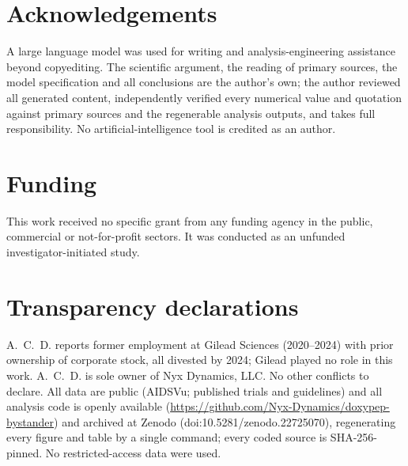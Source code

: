 \documentclass[12pt,a4paper]{article}
\begin{document}
\section*{Acknowledgements}
A large language model was used for writing and analysis-engineering assistance
beyond copyediting. The scientific argument, the reading of primary sources, the
model specification and all conclusions are the author's own; the author reviewed
all generated content, independently verified every numerical value and quotation
against primary sources and the regenerable analysis outputs, and takes full
responsibility. No artificial-intelligence tool is credited as an author.

\section*{Funding}
This work received no specific grant from any funding agency in the public,
commercial or not-for-profit sectors. It was conducted as an unfunded
investigator-initiated study.

\section*{Transparency declarations}
A.~C.~D. reports former employment at Gilead Sciences (2020--2024) with prior
ownership of corporate stock, all divested by 2024; Gilead played no role in this
work. A.~C.~D. is sole owner of Nyx Dynamics, LLC. No other conflicts to declare.
All data are public (AIDSVu; published trials and guidelines) and all analysis
code is openly available (\url{https://github.com/Nyx-Dynamics/doxypep-bystander})
and archived at Zenodo (doi:10.5281/zenodo.22725070),\cite{demidont2026compendium}
regenerating every figure
and table by a single command; every coded source is SHA-256-pinned. No
restricted-access data were used.


\end{document}
